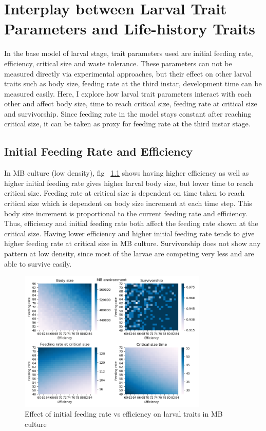 \chapter{Interplay between Larval Trait Parameters and Life-history Traits}
In the base model of larval stage, trait parameters used are initial feeding rate, efficiency, critical size and waste tolerance. These parameters can not be measured directly via experimental approaches, but their effect on other larval traits such as body size, feeding rate at the third instar, development time can be measured easily. Here, I explore how larval trait parameters interact with each other and affect body size, time to reach critical size, feeding rate at critical size and survivorship. Since feeding rate in the model stays constant after reaching critical size, it can be taken as proxy for feeding rate at the third instar stage.
\section{Initial Feeding Rate and Efficiency}
In MB culture (low density), fig ~\ref{fig:fr vs eff mb} shows having higher efficiency as well as higher initial feeding rate gives higher larval body size, but lower time to reach critical size. Feeding rate at critical size is dependent on time taken to reach critical size which is dependent on body size increment at each time step. This body size increment is proportional to the current feeding rate and efficiency. Thus, efficiency and initial feeding rate both affect the feeding rate shown at the critical size. Having lower efficiency and higher initial feeding rate tends to give higher feeding rate at critical size in MB culture. Survivorship does not show any pattern at low density, since most of the larvae are competing very less and are able to survive easily. \\
\begin{figure}[h]
  \centering
  \includegraphics[width=0.8\textwidth]{C3/Figs/Feeding rate_vs_Efficiency_MB}
  \caption{Effect of initial feeding rate vs efficiency on larval traits in MB culture}
  \label{fig:fr vs eff mb}
\end{figure}\\

